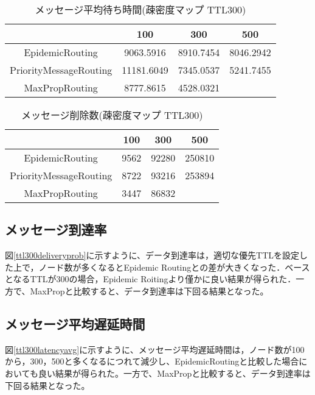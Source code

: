 \documentclass[11pt]{icsthesis}
\begin{document}
\begin{table}[H]
 \begin{center}
      \caption[]{メッセージ平均待ち時間(疎密度マップ TTL300)}
      \label{somituTtl300latencyavg}
      \begin{tabular}{|c|c|c|c|}
\hline
&100&300&500\\
\hline
EpidemicRouting&9063.5916&8910.7454&8046.2942\\
\hline
PriorityMessageRouting&11181.6049&7345.0537&5241.7455\\
\hline
MaxPropRouting&8777.8615&4528.0321
&\\
\hline
      \end{tabular}
    \end{center}
\end{table}

\begin{table}[H]
 \begin{center}
      \caption[]{メッセージ削除数(疎密度マップ TTL300)}
      \label{somituTtl300dropped}
      \begin{tabular}{|c|c|c|c|}
\hline
&100&300&500\\
\hline
EpidemicRouting&9562&92280 &250810\\
\hline
PriorityMessageRouting&8722&93216&253894\\
\hline
MaxPropRouting&3447&86832&\\
\hline
      \end{tabular}
    \end{center}
\end{table}
\subsection{メッセージ到達率}
図\ref{ttl300deliveryprob}に示すように、データ到達率は，適切な優先TTLを設定した上で，ノード数が多くなるとEpidemic Routingとの差が大きくなった．ベースとなるTTLが300の場合，Epidemic Roitingより僅かに良い結果が得られた．一方で、MaxPropと比較すると、データ到達率は下回る結果となった。
\subsection{メッセージ平均遅延時間}
図\ref{ttl300latencyavg}に示すように、メッセージ平均遅延時間は，ノード数が100から，300，500と多くなるにつれて減少し、EpidemicRoutingと比較した場合においても良い結果が得られた。一方で、MaxPropと比較すると、データ到達率は下回る結果となった。

\end{document}
